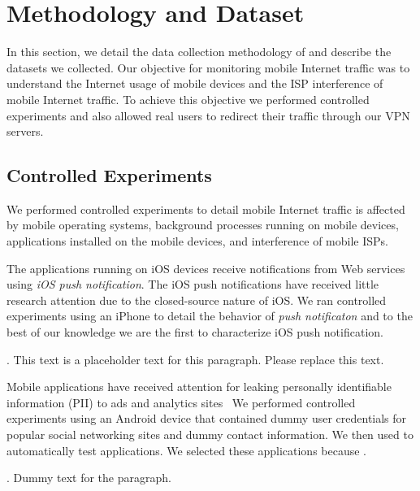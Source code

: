 \section{Methodology and Dataset}
\label{sec:Methodology}

In this section, we detail the data collection methodology of \platname and describe the datasets we collected.
Our objective for monitoring mobile Internet traffic was to understand the Internet usage of  mobile devices and the ISP interference of mobile Internet traffic. 
To achieve this objective we performed controlled experiments and also allowed real users to redirect their traffic through our VPN servers.  

\subsection{Controlled Experiments}

We performed controlled experiments to detail mobile Internet traffic is affected by mobile operating systems, background processes running on mobile devices, applications installed on the mobile devices, and interference of mobile ISPs.

The applications running on iOS devices receive notifications from Web services using \emph{iOS push notification}.  
The iOS push notifications have received little research attention due to the closed-source nature of iOS.
We ran controlled experiments using an iPhone to detail the behavior of \emph{push notificaton} and to the best of our knowledge we are the first to characterize iOS push notification.

. 
This text is a placeholder text for this paragraph. Please replace this text. 

Mobile applications have received attention for leaking personally identifiable information (PII) to ads and analytics sites~\cite{hornyack:appfence,egele:pios}
We performed controlled experiments using an Android device that contained dummy user credentials for popular social networking sites and dummy contact information.
We then used  to automatically test  applications. 
We selected these applications because \tbd{}.

. 
Dummy text for the paragraph.



